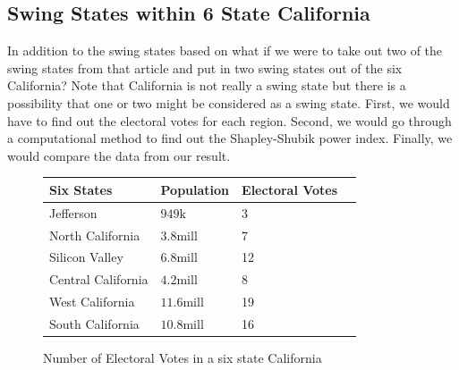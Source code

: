\documentclass[12pt]{article}
\begin{document}
\subsection{Swing States within 6 State California}
In addition to the swing states based on \cite{C} what if we were to take out two of the swing states from that article and put in two swing states out of the six California? Note that California is not really a swing state but there is a possibility that one or two might be considered as a swing state. First, we would have to find out the electoral votes for each region. Second, we would go through a computational method to find out the Shapley-Shubik power index. Finally, we would compare the data from our result.
\begin{figure}
\begin{center}
\begin{tabular}{ | l | l | l | p{5cm} |}
    \hline
    Six States& Population & Electoral Votes \\ \hline
    Jefferson&$949\text{k}$ & 3 \\ \hline
    North California&$3.8 \text{mill}$ & 7  \\ \hline
    Silicon Valley&$6.8 \text{mill}$ & 12  \\ \hline
    Central California&$4.2 \text{mill}$ & 8 \\ \hline
    West California&$11.6 \text{mill}$ & 19  \\ \hline
    South California&$10.8 \text{mill}$ & 16 \\ \hline
    \end{tabular}
    \caption{Number of Electoral Votes in a six state California \label{overflow}}
\end{center}
\end{figure}
\end{document}
